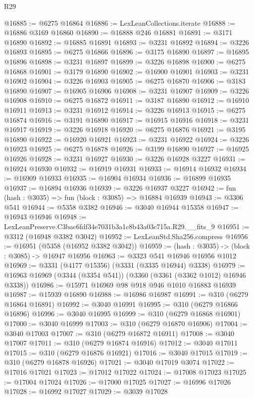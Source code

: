 \begin{lexlean}{R29}
\begin{coremodule}
@16885 := @6275 @16864
@16886 := LexLeanCollections.iterate
@16888 := @16886 @3169 @16860
@16890 := @16888 @246 @16881
@16891 := @3171 @16890
@16892 := @16885 @16891
@16893 := @3231 @16892
@16894 := @3226 @16893
@16895 := @6275 @16866
@16896 := @3175 @16890
@16897 := @16895 @16896
@16898 := @3231 @16897
@16899 := @3226 @16898
@16900 := @6275 @16868
@16901 := @3179 @16890
@16902 := @16900 @16901
@16903 := @3231 @16902
@16904 := @3226 @16903
@16905 := @6275 @16870
@16906 := @3183 @16890
@16907 := @16905 @16906
@16908 := @3231 @16907
@16909 := @3226 @16908
@16910 := @6275 @16872
@16911 := @3187 @16890
@16912 := @16910 @16911
@16913 := @3231 @16912
@16914 := @3226 @16913
@16915 := @6275 @16874
@16916 := @3191 @16890
@16917 := @16915 @16916
@16918 := @3231 @16917
@16919 := @3226 @16918
@16920 := @6275 @16876
@16921 := @3195 @16890
@16922 := @16920 @16921
@16923 := @3231 @16922
@16924 := @3226 @16923
@16925 := @6275 @16878
@16926 := @3199 @16890
@16927 := @16925 @16926
@16928 := @3231 @16927
@16930 := @3226 @16928 @3227
@16931 := @16924 @16930
@16932 := @16919 @16931
@16933 := @16914 @16932
@16934 := @16909 @16933
@16935 := @16904 @16934
@16936 := @16899 @16935
@16937 := @16894 @16936
@16939 := @3226 @16937 @3227
@16942 := fun (hash : @3035) => fun (block : @3085) => @16884 @16939
@16943 := @3306 @541
@16944 := @5358 @3382
@16946 := @3040 @16944 @15358
@16947 := @16943 @16946
@16948 := LexLeanPreserve.C3bac6fdf34e7031b3a1c8b43a03c715a.R29.__fits_9
@16951 := @3312 (@16948 @3382 @3042)
@16952 := LexLeanStd.Sha256.compress
@16956 := @16951 (@5358 (@16952 @3382 @3042))
@16959 := (hash : @3035) -> (block : @3085) -> @16947 @16956
@16963 := @3323 @541 @16946 @16956 @1012
@16969 := @3331 (@4177 @15356) (@3331 (@3335 @16944) @3338)
@16979 := @16963 @16969 (@3344 (@3354 @541)) (@3360 (@3361 (@3362 @1012) @16946 @3338))
@16986 := @15971 @16969 @98 @918 @946 @1010 @16883 @16939
@16987 := @15939 @16890
@16988 := @16986 @16987
@16991 := @310 (@6279 @16864 @16891)
@16992 := @3040 @16991
@16995 := @310 (@6279 @16866 @16896)
@16996 := @3040 @16995
@16999 := @310 (@6279 @16868 @16901)
@17000 := @3040 @16999
@17003 := @310 (@6279 @16870 @16906)
@17004 := @3040 @17003
@17007 := @310 (@6279 @16872 @16911)
@17008 := @3040 @17007
@17011 := @310 (@6279 @16874 @16916)
@17012 := @3040 @17011
@17015 := @310 (@6279 @16876 @16921)
@17016 := @3040 @17015
@17019 := @310 (@6279 @16878 @16926)
@17021 := @3040 @17019 @3074
@17022 := @17016 @17021
@17023 := @17012 @17022
@17024 := @17008 @17023
@17025 := @17004 @17024
@17026 := @17000 @17025
@17027 := @16996 @17026
@17028 := @16992 @17027
@17029 := @3039 @17028

\end{coremodule}
\end{lexlean}

